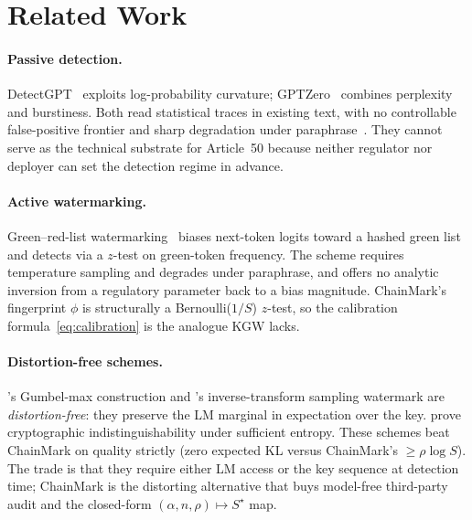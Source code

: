 \section{Related Work}
\label{sec:related}

\paragraph{Passive detection.} DetectGPT~\citep{mitchell2023detectgpt}
exploits log-probability curvature; GPTZero~\citep{tian2023gptzero}
combines perplexity and burstiness. Both read statistical traces in
existing text, with no controllable false-positive frontier and sharp
degradation under
paraphrase~\citep{krishna2023paraphrasing,sadasivan2023can}. They
cannot serve as the technical substrate for Article~50 because neither
regulator nor deployer can set the detection regime in advance.

\paragraph{Active watermarking.} Green--red-list
watermarking~\citep{kirchenbauer2023watermark} biases next-token
logits toward a hashed green list and detects via a $z$-test on
green-token frequency. The scheme requires temperature sampling
and degrades under paraphrase, and offers no analytic inversion
from a regulatory parameter back to a bias magnitude. ChainMark's
fingerprint $\phi$ is structurally a Bernoulli($1/S$) $z$-test,
so the calibration formula~\eqref{eq:calibration} is the analogue
KGW lacks.

\paragraph{Distortion-free schemes.}
\citet{aaronson2023semstamp}'s Gumbel-max construction and
\citet{kuditipudi2023robust}'s inverse-transform sampling watermark
are \emph{distortion-free}: they preserve the LM marginal in
expectation over the key. \citet{christ2024undetectable} prove
cryptographic indistinguishability under sufficient entropy. These
schemes beat ChainMark on quality strictly (zero expected KL versus ChainMark's
$\geq \rho \log S$). The trade is that they require either LM
access or the key sequence at detection time; ChainMark is the
distorting alternative that buys model-free third-party audit and
the closed-form $(\alpha, n, \rho) \mapsto S^\star$ map.

